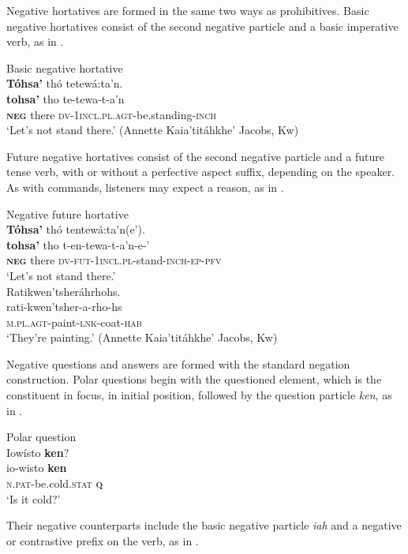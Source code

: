 \documentclass[output=paper,colorlinks,citecolor=brown]{langscibook}
\begin{document}
Negative hortatives are formed in the same two ways as prohibitives. Basic negative hortatives consist of the second negative particle and a basic imperative verb, as in .

\ea\label{ex:moh:33}Basic negative hortative \\
    \glll \textbf{Tóhsa’} thó tetewá:ta’n. \\
         \textbf{tohsa’} tho te-tewa-t-a’n\\
         \textbf{\textsc{neg}} there \textsc{dv-1incl.pl.agt}-be.standing-\textsc{inch}\\
    \glt ‘Let’s not stand there.’ (Annette Kaia’titáhkhe’ Jacobs, Kw)
\z

Future negative hortatives consist of the second negative particle and a future tense verb, with or without a perfective aspect suffix, depending on the speaker. As with commands, listeners may expect a reason, as in .

\ea\label{ex:moh:34}Negative future hortative \\  
    \glll \textbf{Tóhsa’} thó tentewá:ta’n(e’). \\ 
         \textbf{tohsa’} tho t-en-tewa-t-a’n-e-’ \\
         \textbf{\textsc{neg}} there \textsc{dv-fut-1incl.pl-}stand-\textsc{inch-ep-pfv} \\
    \glt ‘Let’s not stand there.’\\ \medskip
    \glll Ratikwen’tsheráhrhohs. \\
         rati-kwen’tsher-a-rho-hs \\
         \textsc{m.pl.agt}-paint-\textsc{lnk-}coat-\textsc{hab}\\ 
    \glt ‘They’re painting.’ (Annette Kaia’titáhkhe’ Jacobs, Kw)
\z 

Negative questions and answers are formed with the standard negation construction. Polar questions begin with the questioned element, which is the constituent in focus, in initial position, followed by the question particle \textit{ken}, as in .

\ea\label{ex:moh:35}Polar question\\
    \glll Iowísto \textbf{ken}? \\
         io-wisto \textbf{ken}\\
         \textsc{n.pat}-be.cold.\textsc{stat} \textbf{\textsc{q}}\\
    \glt ‘Is it cold?’
\z

Their negative counterparts include the basic negative particle \textit{iah} and a negative or contrastive prefix on the verb, as in . 
\end{document}
